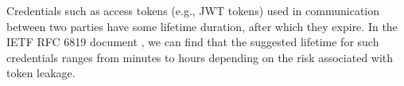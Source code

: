 Credentials such as access tokens (e.g., JWT tokens) used in communication between two parties have some lifetime duration, after which they expire. In the IETF RFC 6819 document \cite{RFC6819O36:online}, we can find that the suggested lifetime for such credentials ranges from minutes to hours depending on the risk associated with token leakage.